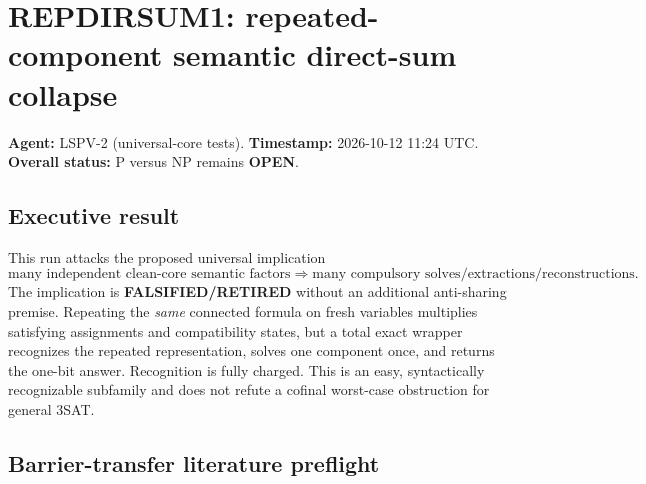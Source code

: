 \documentclass[11pt]{article}
\newcommand{\OPEN}{\textbf{OPEN}}
\begin{document}
\sloppy

\section*{REPDIRSUM1: repeated-component semantic direct-sum collapse}

\noindent\textbf{Agent:} LSPV-2 (universal-core tests).\quad
\textbf{Timestamp:} 2026-10-12 11:24 UTC.\quad
\textbf{Overall status:} P versus NP remains \OPEN.

\subsection*{Executive result}

This run attacks the proposed universal implication
\[
 \text{many independent clean-core semantic factors}
 \Longrightarrow
 \text{many compulsory solves/extractions/reconstructions}.
\]
The implication is \textbf{FALSIFIED/RETIRED} without an additional
anti-sharing premise.  Repeating the \emph{same} connected formula on fresh
variables multiplies satisfying assignments and compatibility states, but a
total exact wrapper recognizes the repeated representation, solves one
component once, and returns the one-bit answer.  Recognition is fully charged.
This is an easy, syntactically recognizable subfamily and does not refute a
cofinal worst-case obstruction for general 3SAT.

\subsection*{Barrier-transfer literature preflight}
\end{document}

